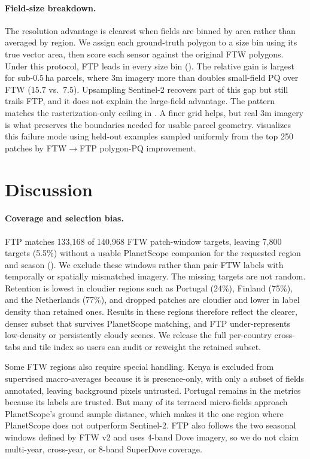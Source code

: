 \documentclass[10pt,twocolumn,letterpaper]{article}
\begin{document}
\paragraph{Field-size breakdown.}
The resolution advantage is clearest when fields are binned by area rather than averaged by region. We assign each ground-truth polygon to a size bin using its true vector area, then score each sensor against the original FTW polygons. Under this protocol, FTP leads in every size bin (). The relative gain is largest for sub-$0.5$\,ha parcels, where 3m imagery more than doubles small-field PQ over FTW ($15.7$ vs.\ $7.5$). Upsampling Sentinel-2 recovers part of this gap but still trails FTP, and it does not explain the large-field advantage. The pattern matches the rasterization-only ceiling in . A finer grid helps, but real 3m imagery is what preserves the boundaries needed for usable parcel geometry.  visualizes this failure mode using held-out examples sampled uniformly from the top 250 patches by FTW$\rightarrow$FTP polygon-PQ improvement.

\section{Discussion}
\label{sec:limitations}

\paragraph{Coverage and selection bias.}
FTP matches 133{,}168 of 140{,}968 FTW patch-window targets, leaving 7{,}800 targets (5.5\%) without a usable PlanetScope companion for the requested region and season (). We exclude these windows rather than pair FTW labels with temporally or spatially mismatched imagery. The missing targets are not random. Retention is lowest in cloudier regions such as Portugal (24\%), Finland (75\%), and the Netherlands (77\%), and dropped patches are cloudier and lower in label density than retained ones. Results in these regions therefore reflect the clearer, denser subset that survives PlanetScope matching, and FTP under-represents low-density or persistently cloudy scenes. We release the full per-country cross-tabs and tile index so users can audit or reweight the retained subset.

Some FTW regions also require special handling. Kenya is excluded from supervised macro-averages because it is presence-only, with only a subset of fields annotated, leaving background pixels untrusted. Portugal remains in the metrics because its labels are trusted. But many of its terraced micro-fields approach PlanetScope's ground sample distance, which makes it the one region where PlanetScope does not outperform Sentinel-2. FTP also follows the two seasonal windows defined by FTW v2 and uses 4-band Dove imagery, so we do not claim multi-year, cross-year, or 8-band SuperDove coverage.
\end{document}
